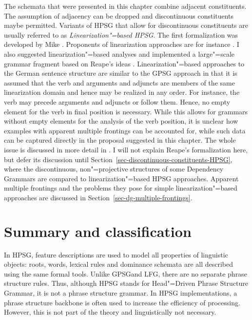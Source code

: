 \label{sec-linearization-HPSG}

The schemata that were presented in this chapter combine adjacent constituents. The assumption of
adjacency can be dropped and discontinuous constituents maybe permitted. Variants of HPSG that allow
for discontinuous constituents are usually referred to as \emph{Linearization"=based HPSG}. The
first formalization was developed by Mike \citet{Reape91,Reape92a,Reape94a}. Proponents of linearization
approaches are for instance
\citet{Kathol95a,Kathol2000a,DS99a,RS99a,Crysmann2003c,BS2004a,Sato:06cluk,Wetta2011a}. I also
suggested linearization"=based analyses \citep{Mueller99a,Mueller2002b} and implemented a
large"=scale grammar fragment based on Reape's ideas \citep{Babel}. Linearization"=based approaches
to the German sentence structure are similar to the GPSG approach in that it is assumed that the verb
and arguments and adjuncts are members of the same linearization domain and hence may be realized in
any order. For instance, the verb may precede arguments and adjuncts or follow them. Hence, no empty element for the verb in
final position is necessary. While this allows for grammars without empty elements for the analysis of the verb
position, it is unclear how examples with apparent multiple frontings can be accounted for, while
such data can be captured directly in the proposal suggested in this chapter. The
whole issue is discussed in more detail in . I will not explain Reape's
formalization here, but defer its discussion until Section~\ref{sec-discontinuous-constituents-HPSG}, where the discontinuous, non"=projective
structures of some Dependency Grammars are compared to linearization"=based HPSG
approaches. Apparent multiple frontings and the problems they pose for simple linearization"=based
approaches are discussed in Section~\ref{sec-dg-multiple-frontings}.


\section{Summary and classification}

In HPSG, feature descriptions are used to model all properties of linguistic objects: roots, words, lexical rules and dominance schemata are
all described using the same formal tools. Unlike GPSG\indexgpsg and LFG\indexlfg, there are no separate phrase structure rules. Thus, although
HPSG stands for Head"=Driven Phrase Structure Grammar, it is not a phrase structure grammar. In HPSG implementations, a phrase structure backbone
is often used to increase the efficiency of processing. However, this is not part of the theory and
linguistically not necessary.

